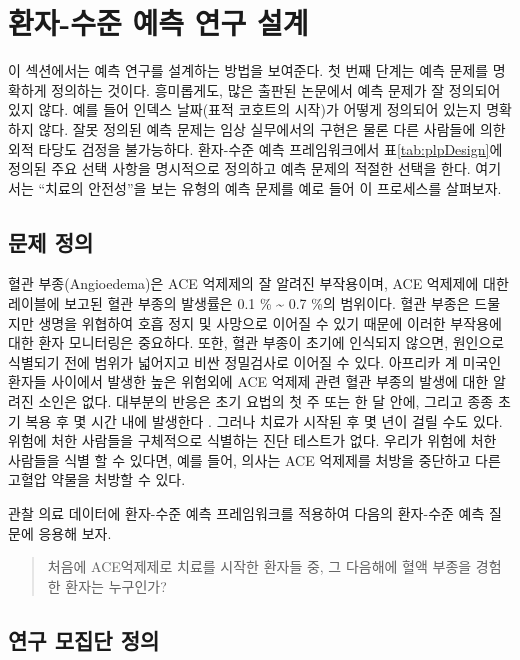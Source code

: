 \documentclass[11pt]{book}
\theoremstyle{definition}
\theoremstyle{definition}
\theoremstyle{definition}
\theoremstyle{remark}
\begin{document}
\section{환자-수준 예측 연구 설계}\label{----}

이 섹션에서는 예측 연구를 설계하는 방법을 보여준다. 첫 번째 단계는 예측
문제를 명확하게 정의하는 것이다. 흥미롭게도, 많은 출판된 논문에서 예측
문제가 잘 정의되어 있지 않다. 예를 들어 인덱스 날짜(표적 코호트의
시작)가 어떻게 정의되어 있는지 명확하지 않다. 잘못 정의된 예측 문제는
임상 실무에서의 구현은 물론 다른 사람들에 의한 외적 타당도 검정을
불가능하다. 환자-수준 예측 프레임워크에서 표\ref{tab:plpDesign}에 정의된
주요 선택 사항을 명시적으로 정의하고 예측 문제의 적절한 선택을 한다.
여기서는 ``치료의 안전성''을 보는 유형의 예측 문제를 예로 들어 이
프로세스를 살펴보자.

\subsection{문제 정의}\label{-}

혈관 부종(Angioedema)은 ACE 억제제의 잘 알려진 부작용이며, ACE 억제제에
대한 레이블에 보고된 혈관 부종의 발생률은 0.1 \% \textasciitilde{} 0.7
\%의 범위이다. \citep{byrd_2006} 혈관 부종은 드물지만 생명을 위협하여
호흡 정지 및 사망으로 이어질 수 있기 때문에 이러한 부작용에 대한 환자
모니터링은 중요하다. \citep{norman_2013} 또한, 혈관 부종이 초기에
인식되지 않으면, 원인으로 식별되기 전에 범위가 넓어지고 비싼 정밀검사로
이어질 수 있다. \citep{norman_2013, thompson_1993} 아프리카 계 미국인
환자들 사이에서 발생한 높은 위험외에 ACE 억제제 관련 혈관 부종의 발생에
대한 알려진 소인은 없다. \citep{byrd_2006} 대부분의 반응은 초기 요법의
첫 주 또는 한 달 안에, 그리고 종종 초기 복용 후 몇 시간 내에 발생한다
\citep{circardi_2004}. 그러나 치료가 시작된 후 몇 년이 걸릴 수도 있다.
\citep{mara_1996} 위험에 처한 사람들을 구체적으로 식별하는 진단 테스트가
없다. 우리가 위험에 처한 사람들을 식별 할 수 있다면, 예를 들어, 의사는
ACE 억제제를 처방을 중단하고 다른 고혈압 약물을 처방할 수
있다. 

관찰 의료 데이터에 환자-수준 예측 프레임워크를 적용하여 다음의 환자-수준
예측 질문에 응용해 보자.

\begin{quote}
처음에 ACE억제제로 치료를 시작한 환자들 중, 그 다음해에 혈액 부종을
경험한 환자는 누구인가?
\end{quote}

\subsection{연구 모집단 정의}\label{--}
\end{document}
